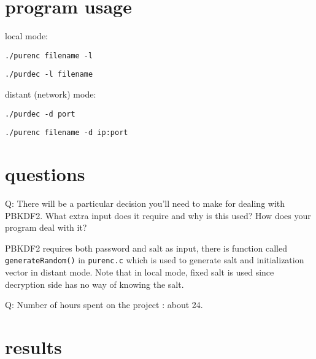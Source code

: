 \documentclass[11pt, oneside]{article}   	%
\begin{document}
\section{program usage}
local mode:

\verb|./purenc filename -l|

\verb|./purdec -l filename|

distant (network) mode:

\verb|./purdec -d port|

\verb|./purenc filename -d ip:port|

\section{questions}
Q: There will be a particular decision you’ll need to make for dealing with PBKDF2. What extra input does it require and why is this used? How does your program deal with it?

PBKDF2 requires both password and salt as input, there is function called \texttt{generateRandom()} in \texttt{purenc.c} which is used to generate salt and initialization vector in distant mode. Note that in local mode, fixed salt is used since decryption side has no way of knowing the salt.


Q: Number of hours spent on the project : about 24.

\section{results}
\end{document}
